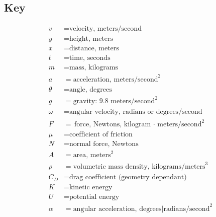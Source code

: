\documentclass[10pt, letterpaper]{book}
\begin{document}
    \pagebreak

    \subsection*{Key}
    \begin{align*}
        v       & = \text{velocity, meters/second}                                  \\
        y       & = \text{height, meters}                                           \\
        x       & = \text{distance, meters}                                         \\
        t       & = \text{time, seconds}                                            \\
        m       & = \text{mass, kilograms}                                          \\
        a       & = \text{acceleration, meters/second}^{2}                          \\
        \theta  & = \text{angle, degrees}                                           \\
        g       & = \text{gravity: 9.8 meters/second}^{2}                           \\
        \omega  & = \text{angular velocity, radians or degrees/second}              \\
        F       & = \text{force, Newtons, kilogram $\cdot$ meters/second}^{2}       \\
        \mu     & = \text{coefficient of friction}                                  \\
        N       & = \text{normal force, Newtons}                                    \\
        A       & = \text{area, meters}^{2}                                         \\
        \rho    & = \text{volumetric mass density, kilograms/meters}^{3}            \\
        C_{D}   & = \text{drag coefficient (geometry dependant)}                    \\
        K       & = \text{kinetic energy}                                           \\
        U       & = \text{potential energy}                                         \\
        \alpha  & = \text{angular acceleration, degrees|radians/second}^{2}
    \end{align*}
\end{document}
